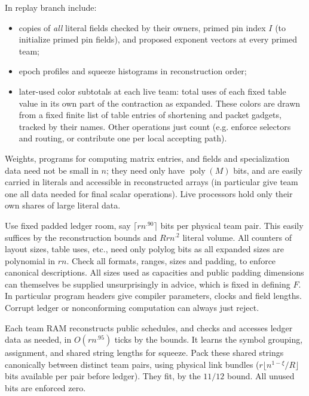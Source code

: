\documentclass[11pt,letterpaper]{article}
\theoremstyle{definition}
\numberwithin{equation}{section}
\DeclareMathOperator{\poly}{poly}
\begin{document}
In replay branch include:

\begin{itemize}
\item copies of \emph{all} literal fields checked by their owners, primed pin index $I$ (to initialize
primed pin fields), and proposed exponent vectors at every primed team;
\item epoch profiles and squeeze histograms in reconstruction order;
\item later-used color subtotals at each live team: total uses of each fixed table value in its
own part of the contraction as expanded. These colors are drawn from a fixed finite
list of table entries of shortening and packet gadgets, tracked by their names. Other
operations just count (e.g. enforce selectors and routing, or contribute one per local
accepting path).
\end{itemize}

Weights, programs for computing matrix entries, and fields and specialization data need
not be small in $n$; they need only have $\poly(M)$ bits, and are easily carried in literals and
accessible in reconstructed arrays (in particular give team one all data needed for final scalar
operations). Live processors hold only their own shares of large literal data.

Use fixed padded ledger room, say $\lceil rn^{.90}\rceil$ bits per physical team pair. This easily
suffices by the reconstruction bounds and $Rrn^{.2}$ literal volume. All counters of layout sizes,
table uses, etc., need only polylog bits as all expanded sizes are polynomial in $rn$. Check
all formats, ranges, sizes and padding, to enforce canonical descriptions. All sizes used
as capacities and public padding dimensions can themselves be supplied unsurprisingly in
advice, which is fixed in defining $F$. In particular program headers give compiler parameters,
clocks and field lengths. Corrupt ledger or nonconforming computation can always just
reject.

Each team RAM reconstructs public schedules, and checks and accesses ledger data as
needed, in $O(rn^{.95})$ ticks by the bounds. It learns the symbol grouping, assignment, and
shared string lengths for squeeze. Pack these shared strings canonically between distinct
team pairs, using physical link bundles ($r\lfloor n^{1-\xi}/R\rfloor$ bits available per pair before ledger).
They fit, by the $11/12$ bound. All unused bits are enforced zero.
\end{document}
